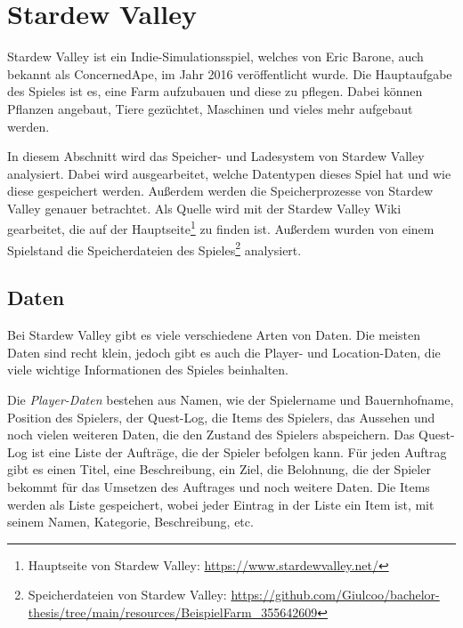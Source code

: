 \section{Stardew Valley}
Stardew Valley ist ein Indie-Simulationsspiel, welches von Eric Barone, auch bekannt als ConcernedApe, im Jahr 2016 veröffentlicht wurde. Die Hauptaufgabe des Spieles ist es, eine Farm aufzubauen und diese zu pflegen. Dabei können Pflanzen angebaut, Tiere gezüchtet, Maschinen und vieles mehr aufgebaut werden.\cite{steampoweredStardewValley} 


In diesem Abschnitt wird das Speicher- und Ladesystem von Stardew Valley analysiert. Dabei wird ausgearbeitet, welche Datentypen dieses Spiel hat und wie diese gespeichert werden. Außerdem werden die Speicherprozesse von Stardew Valley genauer betrachtet. Als Quelle wird mit der Stardew Valley Wiki gearbeitet, die auf der Hauptseite\footnote{Hauptseite von Stardew Valley: \url{https://www.stardewvalley.net/}} zu finden ist. Außerdem wurden von einem Spielstand die Speicherdateien des Spieles\footnote{\label{stardewvalleySavefiles}Speicherdateien von Stardew Valley: \url{https://github.com/Giulcoo/bachelor-thesis/tree/main/resources/BeispielFarm_355642609}} analysiert.



\subsection{Daten}
Bei Stardew Valley gibt es viele verschiedene Arten von Daten. Die meisten Daten sind recht klein, jedoch gibt es auch die Player- und Location-Daten, die viele wichtige Informationen des Spieles beinhalten. 


Die \textit{Player-Daten} bestehen aus Namen, wie der Spielername und Bauernhofname, Position des Spielers, der Quest-Log, die Items des Spielers, das Aussehen und noch vielen weiteren Daten, die den Zustand des Spielers abspeichern. Das Quest-Log ist eine Liste der Aufträge, die der Spieler befolgen kann. Für jeden Auftrag gibt es einen Titel, eine Beschreibung, ein Ziel, die Belohnung, die der Spieler bekommt für das Umsetzen des Auftrages und noch weitere Daten. Die Items werden als Liste gespeichert, wobei jeder Eintrag in der Liste ein Item ist, mit seinem Namen, Kategorie, Beschreibung, \ac{etc}. 

